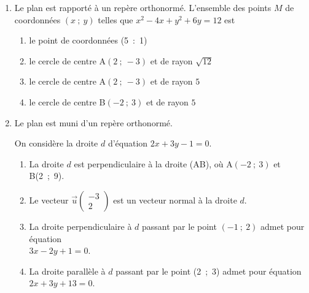 \documentclass[10pt]{article}
\providecommand{\vect}[1]{\overrightarrow{#1}}
\begin{document}
\begin{enumerate}
		\medskip

\item Le plan est rapporté à un repère orthonormé. L'ensemble des points $M$ de coordonnées $(x~;~y)$ telles que $x^2 - 4x +y^2 + 6y = 12$ est
	\begin{enumerate}
		\item le point de coordonnées (5~:~1)
		\item le cercle de centre A$(2~;~-3)$ et de rayon $\sqrt{12}$
		\item le cercle de centre A$(2~;~-3)$ et de rayon $5$
		\item le cercle de centre B$(-2~;~3)$ et de rayon $5$
	\end{enumerate}
	
		\medskip

\item Le plan est muni d'un repère orthonormé.

On considère la droite $d$ d'équation $2x + 3y - 1 = 0$.
	\begin{enumerate}
		\item La droite $d$ est perpendiculaire à la droite (AB), où A$(-2~;~3)$ et B(2~;~9).
		\item  Le vecteur $\vect{u}\begin{pmatrix}-3\\2\end{pmatrix}$ est un vecteur normal à la droite $d$.
		\item  La droite perpendiculaire à $d$ passant par le point $(-1~;~2)$ admet pour équation \\ $3x- 2y+1=0$.
		\item  La droite parallèle à $d$ passant par le point (2~;~3) admet pour équation $2x + 3y + 13 = 0$.
	\end{enumerate}
\end{enumerate}

\bigskip
\end{document}
